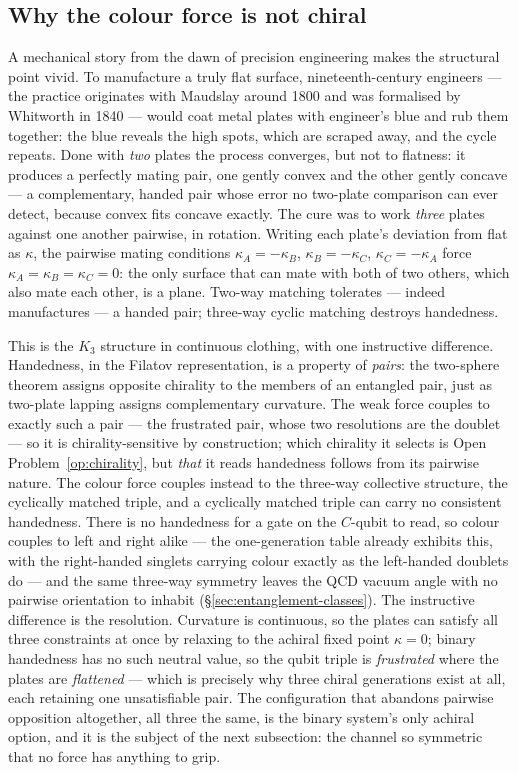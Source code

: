 \subsection{Why the colour force is not chiral}

A mechanical story from the dawn of precision engineering makes the structural point vivid. To
manufacture a truly flat surface, nineteenth-century engineers --- the practice originates with
Maudslay around 1800 and was formalised by Whitworth in 1840 --- would coat metal plates with
engineer's blue and rub them together: the blue reveals the high spots, which are scraped away, and
the cycle repeats. Done with \emph{two} plates the process converges, but not to flatness: it
produces a perfectly mating pair, one gently convex and the other gently concave --- a
complementary, handed pair whose error no two-plate comparison can ever detect, because convex fits
concave exactly. The cure was to work \emph{three} plates against one another pairwise, in
rotation. Writing each plate's deviation from flat as $\kappa$, the pairwise mating conditions
$\kappa_A = -\kappa_B$, $\kappa_B = -\kappa_C$, $\kappa_C = -\kappa_A$ force
$\kappa_A = \kappa_B = \kappa_C = 0$: the only surface that can mate with both of two others, which
also mate each other, is a plane. Two-way matching tolerates --- indeed manufactures --- a handed
pair; three-way cyclic matching destroys handedness.

This is the $K_3$ structure in continuous clothing, with one instructive difference. Handedness, in
the Filatov representation, is a property of \emph{pairs}: the two-sphere theorem assigns opposite
chirality to the members of an entangled pair, just as two-plate lapping assigns complementary
curvature. The weak force couples to exactly such a pair --- the frustrated pair, whose two
resolutions are the doublet --- so it is chirality-sensitive by construction; which chirality it
selects is Open Problem~\ref{op:chirality}, but \emph{that} it reads handedness follows from its
pairwise nature. The colour force couples instead to the three-way collective structure, the
cyclically matched triple, and a cyclically matched triple can carry no consistent handedness. There
is no handedness for a gate on the $C$-qubit to read, so colour couples to left and right alike ---
the one-generation table already exhibits this, with the right-handed singlets carrying colour
exactly as the left-handed doublets do --- and the same three-way symmetry leaves the QCD vacuum
angle with no pairwise orientation to inhabit (\S\ref{sec:entanglement-classes}). The instructive
difference is the resolution. Curvature is continuous, so the plates can satisfy all three
constraints at once by relaxing to the achiral fixed point $\kappa = 0$; binary handedness has no
such neutral value, so the qubit triple is \emph{frustrated} where the plates are \emph{flattened}
--- which is precisely why three chiral generations exist at all, each retaining one unsatisfiable
pair. The configuration that abandons pairwise opposition altogether, all three the same, is the
binary system's only achiral option, and it is the subject of the next subsection: the channel so
symmetric that no force has anything to grip.

